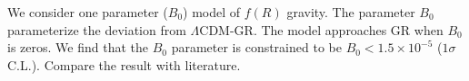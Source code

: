 We consider one parameter ($B_0$) model of $f(R)$ gravity. The parameter $B_0$ parameterize the deviation from $\Lambda$CDM-GR. The model approaches GR when $B_0$ is zeros. We find that the $B_0$ parameter is constrained to be $B_0 < 1.5 \times 10^{-5}$ ($1\sigma$ C.L.). Compare the result with literature.


